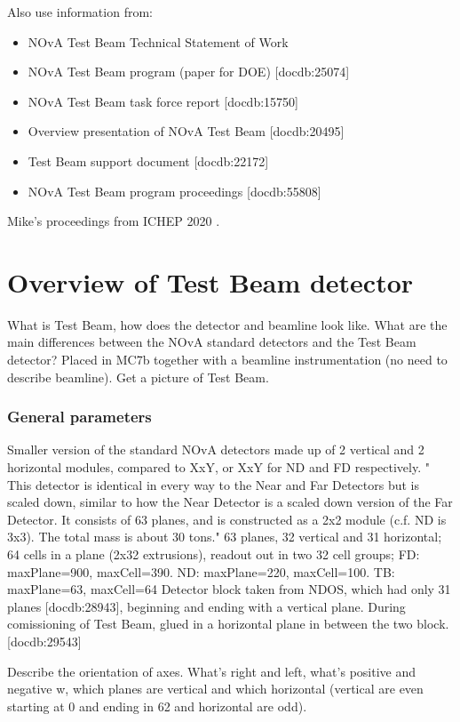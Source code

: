 \documentclass[12pt,a4paper]{article}
\begin{document}
Also use information from:
\begin{itemize}
\item NOvA Test Beam Technical Statement of Work
\item NOvA Test Beam program (paper for DOE) [docdb:25074]
\item NOvA Test Beam task force report [docdb:15750]
\item Overview presentation of NOvA Test Beam [docdb:20495]
\item Test Beam support document [docdb:22172]
\item NOvA Test Beam program proceedings [docdb:55808]
\end{itemize}

Mike's proceedings from ICHEP 2020 \cite{WallbankProceedingsICHEP2020}.

\section{Overview of Test Beam detector}
What is Test Beam, how does the detector and beamline look like.
What are the main differences between the NOvA standard detectors and the Test Beam detector?
Placed in MC7b together with a beamline instrumentation (no need to describe beamline).
Get a picture of Test Beam.

\subsubsection*{General parameters}
Smaller version of the standard NOvA detectors  made up of 2 vertical and 2 horizontal modules, compared to XxY, or XxY for ND and FD respectively.
" This detector is identical in every way to the Near and Far Detectors but is scaled down, similar to how the Near Detector is a scaled down version of the Far Detector. It consists of 63 planes, and is constructed as a 2x2 module (c.f. ND is 3x3). The total mass is about 30 tons."%
63 planes, 32 vertical and 31 horizontal; 64 cells in a plane (2x32 extrusions), readout out in two 32 cell groups;
FD: maxPlane=900, maxCell=390. ND: maxPlane=220, maxCell=100. TB: maxPlane=63, maxCell=64
Detector block taken from NDOS, which had only 31 planes [docdb:28943], beginning and ending with a vertical plane. During comissioning of Test Beam, glued in a horizontal plane in between the two block. [docdb:29543]

Describe the orientation of axes. What's right and left, what's positive and negative w, which planes are vertical and which horizontal (vertical are even starting at 0 and ending in 62 and horizontal are odd).
\end{document}

